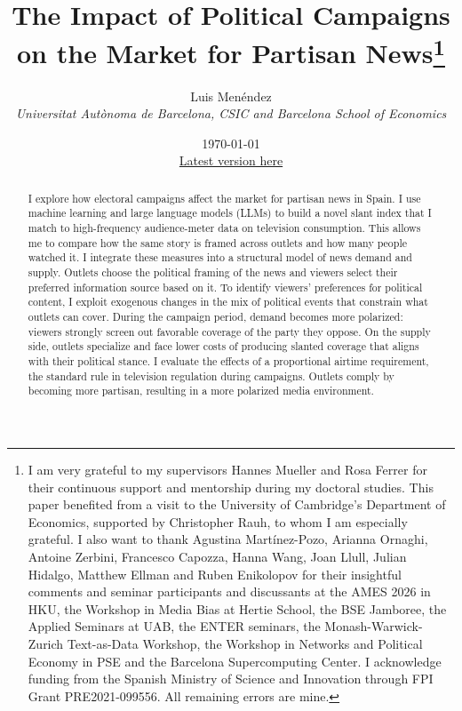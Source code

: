 \documentclass[12pt]{article}
\title{The Impact of Political Campaigns on the Market for Partisan News\thanks{I am very grateful to my supervisors Hannes Mueller and Rosa Ferrer for their continuous support and mentorship during my doctoral studies. This paper benefited from a visit to the University of Cambridge’s Department of Economics, supported by Christopher Rauh, to whom I am especially grateful. I also want to thank Agustina Martínez-Pozo, Arianna Ornaghi, Antoine Zerbini,  Francesco Capozza, Hanna Wang, Joan Llull, Julian Hidalgo, Matthew Ellman and Ruben Enikolopov for their insightful comments and seminar participants and discussants at the AMES 2026 in HKU, the Workshop in Media Bias at Hertie School, the BSE Jamboree, the Applied Seminars at UAB, the ENTER seminars, the Monash-Warwick-Zurich Text-as-Data Workshop, the Workshop in Networks and Political Economy in PSE and the Barcelona Supercomputing Center. I acknowledge funding from the Spanish Ministry of Science and Innovation through FPI Grant PRE2021-099556. All remaining errors are mine.}}
\author{Luis  Menéndez \\
	\textit{\small Universitat Autònoma de Barcelona, CSIC and Barcelona School of Economics}
} %
\date{%
	\today\\[0.2ex]
	{\normalsize\href{https://www.dropbox.com/scl/fi/l66fli8yxvm3f0z2sck1x/jmp_menendez.pdf?rlkey=zz6dnjs5gm6ilhh04op247jxh&dl=0}{Latest version here}}
}
\renewcommand\thepart{}      %
\renewcommand\partname{}      %
\begin{document}
	
\renewcommand\thepart{}      %
\renewcommand\partname{}      %

	
	\maketitle
	\enlargethispage{2\baselineskip}
	
	
	\vspace{-1cm}
	
	
	\begin{abstract}
		



I explore how electoral campaigns affect the market for partisan news in Spain. I use machine learning and large language models (LLMs) to build a novel slant index that I match to high-frequency audience-meter data on television consumption. This allows me to compare how the same story is framed across outlets and how many people watched it. I integrate these measures into a structural model of news demand and supply. Outlets choose the political framing of the news and viewers select their preferred information source based on it. To identify viewers’ preferences for political content, I exploit exogenous changes in the mix of political events that constrain what outlets can cover. During the campaign period, demand becomes more polarized: viewers strongly screen out favorable coverage of the party they oppose. On the supply side, outlets specialize and face lower costs of producing slanted coverage that aligns with their political stance. I evaluate the effects of a proportional airtime requirement, the standard rule in television regulation during campaigns. Outlets comply by becoming more partisan, resulting in a more polarized media environment.








	
	
		\end{abstract}
		
		
		\vfill
		

	
		
\end{document}

